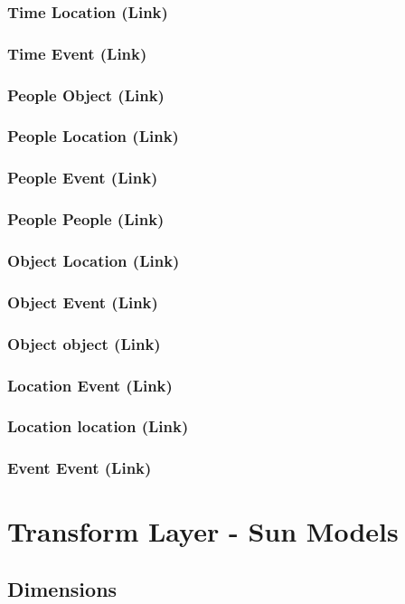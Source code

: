 \documentclass{acm_proc_article-sp}
\begin{document}
\subsubsection{Time Location (Link)}
\subsubsection{Time Event (Link)}
\subsubsection{People Object (Link)}
\subsubsection{People Location (Link)}
\subsubsection{People Event (Link)}
\subsubsection{People People (Link)}
\subsubsection{Object Location (Link)}
\subsubsection{Object Event (Link)}
\subsubsection{Object object (Link)}
\subsubsection{Location Event (Link)}
\subsubsection{Location location (Link)}
\subsubsection{Event Event (Link)}
\newpage
\section{Transform Layer - Sun Models}
\subsection{Dimensions}
\end{document}
